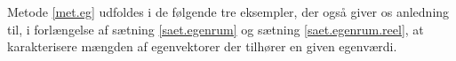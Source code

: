 Metode \ref{met.eg} udfoldes i de følgende tre eksempler, der også giver os anledning til, i forlængelse af sætning \ref{saet.egenrum} og sætning \ref{saet.egenrum.reel}, at karakterisere mængden af egenvektorer der tilhører en given egenværdi.



